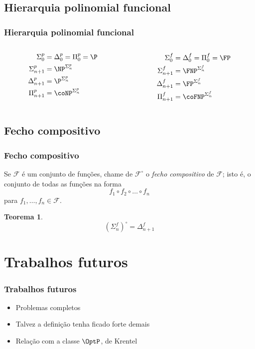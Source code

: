 \documentclass[utf8,notheorems]{beamer}
\newtheorem*{theorem}{Teorema}
\theoremstyle{definition}
\begin{document}
\subsection{Hierarquia polinomial funcional}
\begin{frame}
    \frametitle{Hierarquia polinomial funcional}
    \begin{columns}
        \begin{column}{0.2\textwidth}
            \begin{align*}
                \Sigma_0^p &= \Delta_0^p = \Pi_0^p = \P \\
                \Sigma_{n+1}^p &= \NP^{\Sigma_n^p} \\
                \Delta_{n+1}^p &= \P^{\Sigma_n^p} \\
                \Pi_{n+1}^p &= \coNP^{\Sigma_n^p}
            \end{align*}
        \end{column}
        \begin{column}{0.2\textwidth}
            \begin{align*}
                \Sigma_0^f &= \Delta_0^f = \Pi_0^f = \FP \\
                \Sigma_{n+1}^f &= \FNP^{\Sigma_n^f} \\
                \Delta_{n+1}^f &= \FP^{\Sigma_n^f} \\
                \Pi_{n+1}^f &= \coFNP^{\Sigma_n^f}
            \end{align*}
        \end{column}
    \end{columns}
\end{frame}

\subsection{Fecho compositivo}
\begin{frame}
    \frametitle{Fecho compositivo}

    Se $\mathcal F$ é um conjunto de funções,
    chame de $\mathcal F^\circ$
    o \emph{fecho compositivo} de $\mathcal F$;
    isto é, o conjunto de todas as funções na forma
    \begin{equation*}
        f_1 \circ f_2 \circ \dots \circ f_n
    \end{equation*}
    para $f_1, \dots, f_n \in \mathcal F$.

    \begin{theorem}
        \begin{equation*}
            (\Sigma_n^f)^\circ = \Delta_{n+1}^f
        \end{equation*}
    \end{theorem}
\end{frame}

\section{Trabalhos futuros}
\begin{frame}
    \frametitle{Trabalhos futuros}
    \begin{itemize}
        \item Problemas completos
        \item Talvez a definição tenha ficado forte demais
        \item Relação com a classe $\OptP$, de Krentel
    \end{itemize}
\end{frame}
\end{document}
